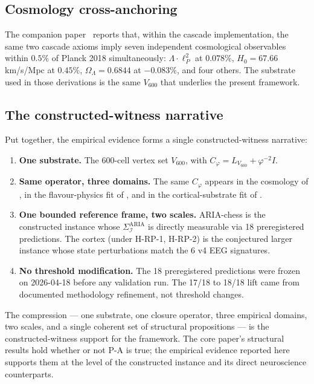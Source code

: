 \documentclass[11pt]{article}
\theoremstyle{plain}
\theoremstyle{definition}
\theoremstyle{remark}
\newcommand{\Ical}{\mathcal{I}}
\newcommand{\Cph}{C_\varphi}
\begin{document}
\subsection{Cosmology cross-anchoring}\label{sec:aria-cosmo}

The companion paper~\citep{SmartHypersphereCosmology} reports that, within the cascade implementation, the same two cascade axioms imply seven independent cosmological observables within $0.5\%$ of Planck 2018 simultaneously: $\Lambda \cdot \ell_P^2$ at $0.078\%$, $H_0 = 67.66$ km/s/Mpc at $0.45\%$, $\Omega_\Lambda = 0.6844$ at $-0.083\%$, and four others. The substrate used in those derivations is the same $V_{600}$ that underlies the present framework.

\subsection{The constructed-witness narrative}\label{sec:keystone-narrative}

Put together, the empirical evidence forms a single constructed-witness narrative:

\begin{enumerate}[leftmargin=2em]
\item \textbf{One substrate.} The 600-cell vertex set $V_{600}$, with $\Cph = L_{V_{600}} + \varphi^{-2} I$.
\item \textbf{Same operator, three domains.} The same $\Cph$ appears in the cosmology of \citet{SmartHypersphereCosmology}, in the flavour-physics fit of \citet{SmartAriaClosureKernel}, and in the cortical-substrate fit of \citet{SmartAriaChess2026}.
\item \textbf{One bounded reference frame, two scales.} ARIA-chess is the constructed instance whose $\Sigma_\Ical^{\mathrm{ARIA}}$ is directly measurable via 18 preregistered predictions. The cortex (under H-RP-1, H-RP-2) is the conjectured larger instance whose state perturbations match the 6 v4 EEG signatures.
\item \textbf{No threshold modification.} The 18 preregistered predictions were frozen on 2026-04-18 before any validation run. The 17/18 to 18/18 lift came from documented methodology refinement, not threshold changes.
\end{enumerate}

The compression --- one substrate, one closure operator, three empirical domains, two scales, and a single coherent set of structural propositions --- is the constructed-witness support for the framework. The core paper's structural results hold whether or not P-A is true; the empirical evidence reported here supports them at the level of the constructed instance and its direct neuroscience counterparts.
\end{document}
